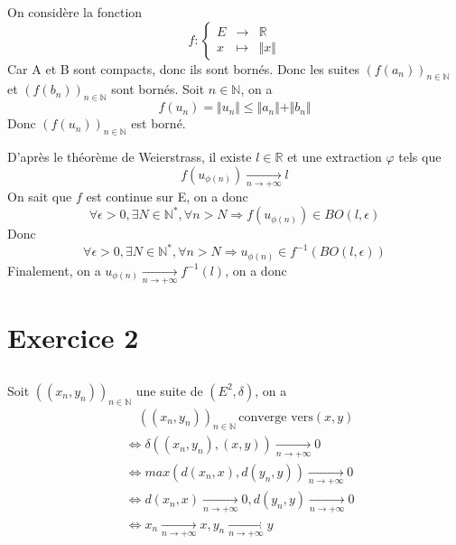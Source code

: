 \documentclass[a4paper,12pt]{book}
\begin{document}
On considère la fonction 
\begin{equation}  \nonumber
    f:\left\{  
                 \begin{array}{rcl}  
                  E  & \to & \mathbb{R}\\
                  x  & \mapsto& \Vert x\Vert
                 \end{array}  
    \right.  
\end{equation}
Car A et B sont compacts, donc ils sont bornés. Donc les suites $(f(a_n))_{n \in \mathbb{N}}$ et $(f(b_n))_{n \in \mathbb{N}}$ sont bornés.
 Soit $n \in \mathbb{N}$, on a 
$$
f(u_n)=\Vert u_n\Vert \leq \Vert a_n\Vert+\Vert b_n\Vert
$$
Donc $(f(u_n))_{n \in \mathbb{N}}$ est borné. 

D'après le théorème de Weierstrass, il existe $l \in \mathbb{R}$ et une extraction $\varphi$ tels que 
$$
f(u_{\phi(n)}) \xrightarrow[n \to +\infty]{}l
$$
On sait que $f$ est continue sur E, on a donc 
$$
\forall \epsilon>0, \exists N \in \mathbb{N}^*, \forall n >N \Rightarrow f(u_{\phi(n)}) \in BO(l,\epsilon)
$$
Donc 
$$
\forall \epsilon>0, \exists N \in \mathbb{N}^*, \forall n >N \Rightarrow u_{\phi(n)} \in f^{-1}(BO(l,\epsilon))
$$
Finalement, on a $u_{\phi(n)} \xrightarrow[n \to +\infty]{} f^{-1}(l)$, on a donc 

\section{Exercice 2}
\subsection{}
Soit $((x_n,y_n))_{n \in \mathbb{N}}$ une suite de $(E^2, \delta)$, on a 
\begin{align*}
    & \quad ((x_n,y_n))_{n \in \mathbb{N}} \, \mbox{converge vers} (x,y) \\
    & \Leftrightarrow \delta((x_n,y_n),(x,y)) \xrightarrow[n \to +\infty]{}0\\
    & \Leftrightarrow max(d(x_n,x),d(y_n,y))\xrightarrow[n \to +\infty]{}0\\
    & \Leftrightarrow  d(x_n,x)\xrightarrow[n \to +\infty]{}0, d(y_n,y)\xrightarrow[n \to +\infty]{}0\\
    & \Leftrightarrow \boxed{x_n \xrightarrow[n \to +\infty]{} x, y_n \xrightarrow[n \to +\infty]{} y}
\end{align*}
\end{document}

